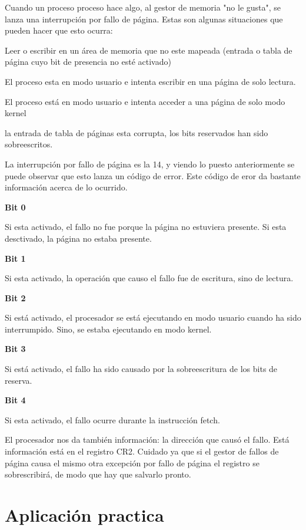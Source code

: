\documentclass{report}
\begin{document}
Cuando un proceso proceso hace algo, al gestor de memoria "no le gusta", se lanza una interrupción por fallo de página. Estas son algunas situaciones que pueden hacer que esto ocurra:

Leer o escribir en un área de memoria que no este mapeada (entrada o tabla de página cuyo bit de presencia no esté activado)

El proceso esta en modo usuario e intenta escribir en una página de solo lectura.

El proceso está en modo usuario e intenta acceder a una página de solo modo kernel

la entrada de tabla de páginas esta corrupta, los bits reservados han sido sobreescritos.

La interrupción por fallo de página es la 14, y viendo lo puesto anteriormente se puede observar que esto lanza un código de error. Este código de eror da bastante información acerca de lo ocurrido.

\textbf{Bit 0}

	Si esta activado, el fallo no fue porque la página no estuviera presente. Si esta desctivado, la página no estaba presente.
    
    
\textbf{Bit 1}

	Si esta activado, la operación que causo el fallo fue de escritura, sino de lectura.
    
    
    
\textbf{Bit 2}

	Si está activado, el procesador se está ejecutando en modo usuario cuando ha sido interrumpido. Sino, se estaba ejecutando en modo kernel.
    
    
    
\textbf{Bit 3}

	Si está activado, el fallo ha sido causado por la sobreescritura de los bits de reserva.    
    
    
    
\textbf{Bit 4}

	Si esta activado, el fallo ocurre durante la instrucción fetch.
	
El procesador nos da también información: la dirección que causó el fallo. Está información está en el registro CR2. Cuidado ya que si el gestor de fallos de página causa el mismo otra excepción por fallo de página el registro se sobrescribirá, de modo que hay que salvarlo pronto.

\section{Aplicación practica}
\end{document}

